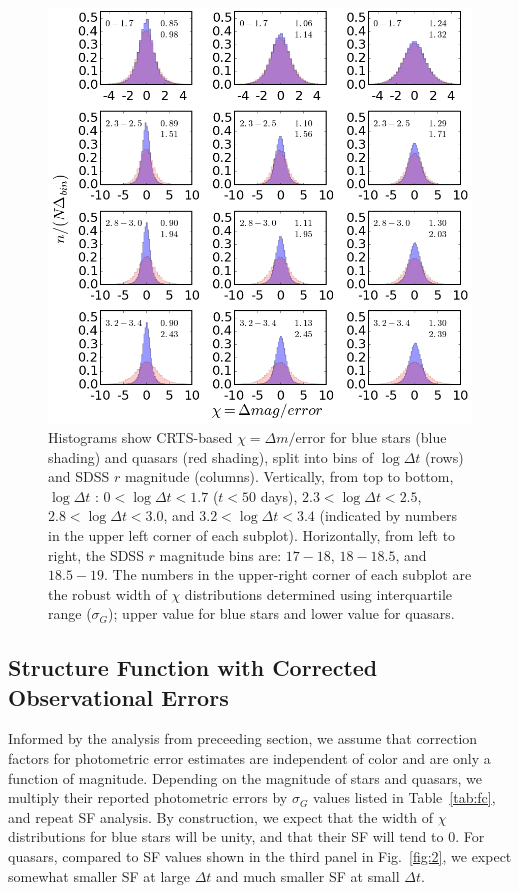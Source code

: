\documentclass[fleqn,usenatbib]{mnras}
\begin{document}
\begin{figure}
\includegraphics[width=1.1\columnwidth, center]{Fig_3_histogram_panels.png}
\vskip -0.15in
\caption{Histograms show CRTS-based $\chi = \Delta m / \mathrm{error}$ for blue stars (blue shading) 
and quasars (red shading), split into bins of $\log{\Delta t}$ (rows) and SDSS $r$ magnitude (columns). 
Vertically, from top to bottom, $\log{\Delta t}$ : $0<\log{\Delta t}<1.7$ ($t < 50 $ days), 
$2.3<\log{\Delta t}<2.5$, $2.8<\log{\Delta t}<3.0$, and $3.2<\log{\Delta t}<3.4$ (indicated by numbers
 in the upper left corner of each subplot). Horizontally, from left to right, the SDSS $r$ magnitude bins are: 
$17-18$,  $18-18.5$, and $18.5-19$. The numbers in the upper-right corner of each subplot are the 
robust width of $\chi$ distributions determined using interquartile range ($\sigma_G$); upper value for
blue stars and lower value for quasars.}
\label{fig:3}
\end{figure}



\subsection{Structure Function with Corrected Observational Errors}

Informed by the analysis from preceeding section, we assume that correction factors for photometric
error estimates are independent of color and are only a function of magnitude. Depending on the magnitude
of stars and quasars, we multiply their reported photometric errors by $\sigma_G$ values listed in 
Table~\ref{tab:fc}, and repeat SF analysis. By construction, we expect that the width of $\chi$ distributions
for blue stars will be unity, and that their SF will tend to 0. For quasars, compared to SF values shown in the third 
panel in Fig.~\ref{fig:2}, we expect somewhat smaller SF at large $\Delta t$ and much smaller SF at small $\Delta t$. 
\end{document}
